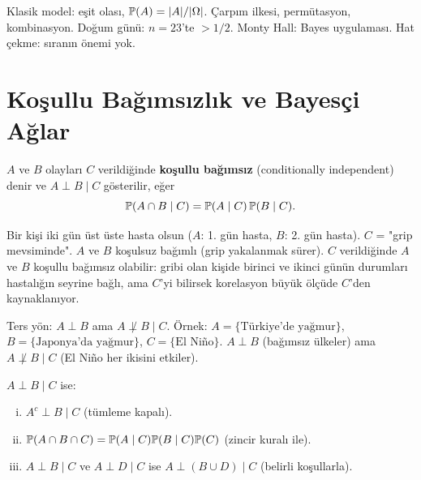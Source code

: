 \begin{mikroozet}[§2.6 özeti]
Klasik model: eşit olası, $\mathbb{P}(A) = |A|/|\Omega|$. Çarpım ilkesi, permütasyon,
kombinasyon. Doğum günü: $n=23$'te $>1/2$. Monty Hall: Bayes uygulaması.
Hat çekme: sıranın önemi yok.
\end{mikroozet}


\section{Koşullu Bağımsızlık ve Bayesçi Ağlar}
\label{sec:kosullu_bagimsizlik}

\begin{tanim}
\label{def:kosullu_bagimsizlik}
$A$ ve $B$ olayları $C$ verildiğinde \textbf{koşullu bağımsız}
(conditionally independent) denir ve $A \perp B \mid C$ gösterilir, eğer
\[
  \mathbb{P}(A \cap B \mid C) = \mathbb{P}(A \mid C)\,\mathbb{P}(B \mid C).
\]
\end{tanim}

\begin{ornek}
Bir kişi iki gün üst üste hasta olsun ($A$: 1. gün hasta, $B$: 2. gün hasta).
$C$ = "grip mevsiminde". $A$ ve $B$ koşulsuz bağımlı (grip yakalanmak sürer).
$C$ verildiğinde $A$ ve $B$ koşullu bağımsız olabilir: gribi olan kişide
birinci ve ikinci günün durumları hastalığın seyrine bağlı, ama $C$'yi bilirsek
korelasyon büyük ölçüde $C$'den kaynaklanıyor.

Ters yön: $A \perp B$ ama $A \not\perp B \mid C$.
Örnek: $A = \{\text{Türkiye'de yağmur}\}$, $B = \{\text{Japonya'da yağmur}\}$, $C = \{\text{El Niño}\}$.
$A \perp B$ (bağımsız ülkeler) ama $A \not\perp B \mid C$ (El Niño her ikisini etkiler).
\end{ornek}

\begin{teorem}
\label{thm:kosullu_bagimsizlik}
$A \perp B \mid C$ ise:
\begin{enumerate}[(i)]
  \item $A^c \perp B \mid C$ (tümleme kapalı).
  \item $\mathbb{P}(A \cap B \cap C) = \mathbb{P}(A \mid C)\mathbb{P}(B \mid C)\mathbb{P}(C)$ (zincir kuralı ile).
  \item $A \perp B \mid C$ ve $A \perp D \mid C$ ise $A \perp (B \cup D) \mid C$ (belirli koşullarla).
\end{enumerate}
\end{teorem}

